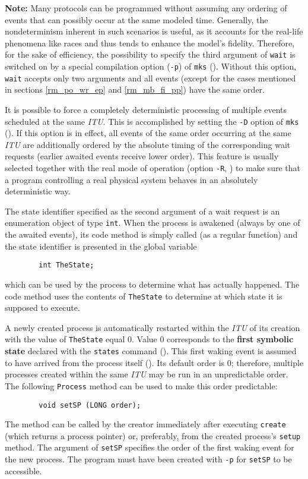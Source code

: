 \medskip

\noindent
{\bf Note:} Many protocols can be programmed without assuming any ordering
of events that can possibly occur at the same modeled time.
Generally, the nondeterminism inherent in such scenarios is useful, as it
accounts for the real-life phenomena like races and thus tends to
enhance the model's fidelity.
Therefore, for the sake of efficiency, the possibility to specify the
third argument of {\tt wait} is switched on by a special compilation option
({\tt -p}) of {\tt mks} ().
Without this option, {\tt wait} accepts only two arguments and all
events (except for the cases mentioned in
sections \ref{rm_po_wr_ep} and \ref{rm_mb_fi_pp}) have the same order.

\medskip

It is possible to force a completely deterministic processing of multiple events
scheduled at the same {\em ITU}.
This is accomplished by setting the {\tt -D} option of {\tt mks}
().
If this option is in effect, all events of the same order occurring at the
same {\em ITU\/}
are additionally ordered by the absolute timing of the corresponding
wait requests (earlier awaited events receive lower order).
This feature is usually selected together with the real mode of operation
(option {\tt -R}, )
to make sure that a program controlling a real physical
system behaves in an absolutely deterministic way.

The state identifier specified as the second argument of a wait
request is an enumeration object of type {\tt int}.
When the process is awakened (always by one of the awaited events), its
code method is simply called (as a regular function) and the
state identifier is presented in the global variable
\begin{verbatim}
        int TheState;
\end{verbatim}
which can be used by the process to determine what has actually happened.
The code method uses the contents of {\tt TheState} to determine at which
state it is supposed to execute.

A newly created process is automatically restarted within the {\em ITU\/}
of its creation with the value of {\tt TheState} equal 0.
Value 0 corresponds to the {\bf first symbolic state} declared with the
{\tt states} command ().
This first waking event is assumed to have arrived from the process itself
().
Its default order is 0; therefore,
multiple processes created within the same {\em ITU\/} may be
run in an unpredictable order.
The following {\tt Process} method can be used to make this order
predictable:
\begin{verbatim}
        void setSP (LONG order);
\end{verbatim}
The method can be called by the creator immediately after executing
{\tt create} (which returns a process pointer) or, preferably, from
the created process's {\tt setup} method.
The argument of {\tt setSP} specifies the order of the first waking event
for the new process.
The program must have been created with 
{\tt -p} for {\tt setSP} to be accessible.

